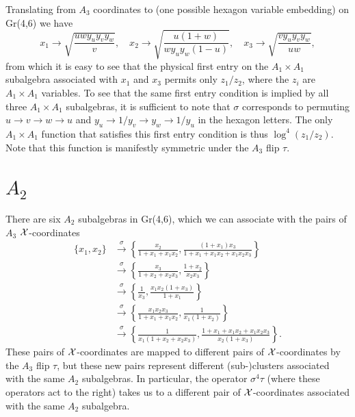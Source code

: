 \documentclass[12pt]{article}
\begin{document}
Translating from $A_3$ coordinates to (one possible hexagon variable embedding) on Gr(4,6) we have
$$x_1 \rightarrow \sqrt{\frac{u w y_u y_v y_w}{v}}, \quad x_2 \rightarrow \sqrt{\frac{u(1+w)}{w y_u y_w (1-u)}}, \quad x_3 \rightarrow \sqrt{\frac{v y_u y_v y_w}{u w}},$$
from which it is easy to see that the physical first entry on the $A_1 \times A_1$ subalgebra associated with $x_1$ and $x_3$ permits only ${z_1}/{z_2}$, where the $z_i$ are $A_1 \times A_1$ variables. To see that the same first entry condition is implied by all three $A_1 \times A_1$ subalgebras, it is sufficient to note that $\sigma$ corresponds to permuting $u \rightarrow v \rightarrow w \rightarrow u$ and $y_u \rightarrow 1/y_v \rightarrow y_w \rightarrow 1/y_u$ in the hexagon letters. The only $A_1 \times A_1$ function that satisfies this first entry condition is thus $\log^4(z_1/z_2)$. Note that this function is manifestly symmetric under the $A_3$ flip $\tau$.  

\section*{$A_2$}
There are six $A_2$ subalgebras in Gr(4,6), which we can associate with the pairs of $A_3$ ${\cal X}$-coordinates 
\begin{align*}
\{ x_1, x_2 \} &\xrightarrow{\sigma} \left \{ \frac{x_2}{1 + x_1 + x_1 x_2}, \frac{(1 + x_1) x_3}{1 + x_1 + x_1 x_2 + x_1 x_2 x_3} \right \} \\
&\xrightarrow{\sigma} \left \{ \frac{x_3}{1 + x_2 + x_2 x_3}, \frac{1 + x_2}{x_2 x_3} \right \}  \\
&\xrightarrow{\sigma} \left \{ \frac{1}{x_3}, \frac{x_1 x_2 (1 + x_3)}{1 + x_1} \right \} \\
&\xrightarrow{\sigma} \left\{ \frac{x_1 x_2 x_3}{1 + x_1 + x_1 x_2}, \frac{1}{x_1 (1 + x_2)} \right \} \\ &\xrightarrow{\sigma} \left \{ \frac{1}{x_1 (1 + x_2 + x_2 x_3)}, \frac{1 + x_1 + x_1 x_2 + x_1 x_2 x_3}{x_2 (1 + x_3)} \right \}.
\end{align*}
These pairs of ${\cal X}$-coordinates are mapped to different pairs of ${\cal X}$-coordinates by the $A_3$ flip $\tau$, but these new pairs represent different (sub-)clusters associated with the same $A_2$ subalgebras. In particular, the operator $\sigma^4 \tau$ (where these operators act to the right) takes us to a different pair of ${\cal X}$-coordinates associated with the same $A_2$ subalgebra.
\end{document}
